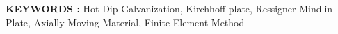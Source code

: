 \documentclass[12pt,twoside]{report}
\begin{document}

\textbf{KEYWORDS :} Hot-Dip Galvanization, Kirchhoff plate, Ressigner Mindlin Plate, Axially Moving Material, Finite Element Method
\end{document}
